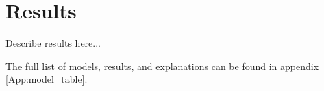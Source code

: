 \chapter{Results}\label{sec:results}
Describe results here...

The full list of models, results, and explanations can be found in appendix \ref{App:model_table}.
